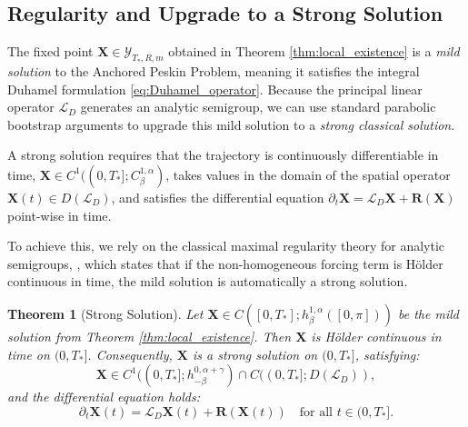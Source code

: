 \documentclass{amsart}
\newtheorem{theorem}{Theorem}[section]
\begin{document}
\subsection{Regularity and Upgrade to a Strong Solution}

The fixed point $\mathbf{X} \in \mathcal{Y}_{T_*, R, m}$ obtained in Theorem \ref{thm:local_existence} is a \emph{mild solution} to the Anchored Peskin Problem, meaning it satisfies the integral Duhamel formulation \eqref{eq:Duhamel_operator}. Because the principal linear operator $\mathcal{L}_D$ generates an analytic semigroup, we can use standard parabolic bootstrap arguments to upgrade this mild solution to a \emph{strong classical solution}. 

A strong solution requires that the trajectory is continuously differentiable in time, $\mathbf{X} \in C^1((0,T_*]; C^{1,\alpha}_\beta)$, takes values in the domain of the spatial operator $\mathbf{X}(t) \in D(\mathcal{L}_D)$, and satisfies the differential equation $\partial_t \mathbf{X} = \mathcal{L}_D \mathbf{X} + \mathbf{R}(\mathbf{X})$ point-wise in time.

To achieve this, we rely on the classical maximal regularity theory for analytic semigroups,
\cite{lunardi1995analytic}, which states that if the non-homogeneous forcing term is H\"older continuous in time, the mild solution is automatically a strong solution.

\begin{theorem}[Strong Solution]\label{thm:strong_solution}
Let $\mathbf{X} \in C([0,T_*]; h^{1,\alpha}_\beta([0,\pi]))$ be the mild solution from Theorem \ref{thm:local_existence}. Then $\mathbf{X}$ is Hölder continuous in time on $(0, T_*]$. Consequently, $\mathbf{X}$ is a strong solution on $(0, T_*]$, satisfying:
\[
\mathbf{X} \in C^1((0,T_*]; h^{0,\alpha+\gamma}_{-\beta}) \cap C((0,T_*]; D(\mathcal{L}_D)),
\]
and the differential equation holds:
\[
\partial_t \mathbf{X}(t) = \mathcal{L}_D \mathbf{X}(t) + \mathbf{R}(\mathbf{X}(t)) \quad \text{for all } t \in (0,T_*].
\]
\end{theorem}
\end{document}
